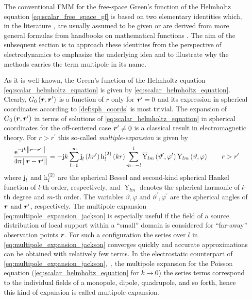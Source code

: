 The conventional \ac{FMM} for the free-space Green's function
of the Helmholtz equation \eqref{eq:scalar_free_space_gf} is based on two
elementary identities which, in the literature \cite{Rokhlin1993,Coifman1993},
are usually assumed to be given or are derived from more general formulas from
handbooks on mathematical functions \cite{Abramowitz2014,Abramowitz2014}.
The aim of the subsequent section is to approach these identities from
the perspective of electrodynamics to emphasize the underlying idea and to
illustrate why the methods carries the term multipole in its name.

As it is well-known, the Green's function of the Helmholtz equation
\eqref{eq:scalar_helmholtz_equation} is given by
\eqref{eq:scalar_helmholtz_equation}.
Clearly, $G_0\left(\robs, \rsrc\right)$ is a function of $r$ only for
$\rsrc = 0$ and its expression in spherical coordinates according to
\cref{def:sph_coords} is most trivial.
The expansion of $G_0\left(\robs, \rsrc\right)$ in terms of solutions of
\eqref{eq:scalar_helmholtz_equation} in spherical coordinates for the
off-centered case $\rsrc \neq 0$ is a classical result in electromagnetic
theory.
For $r > r^\prime$ this so-called \emph{multiple-expansion} is given by
\cite[492]{Jackson2013}
\begin{equation}\label{eq:multipole_expansion_jackson}
	\frac{\exp{-\im k \rdiffNorm}}{4\pi \rdiffNorm} = 
	-\im k \sum_{l = 0}^{\infty}
	\sphbesselj{l} \left(k r^\prime\right)
	\sphbesselh{2}{l} \left(k r\right)
	\sum_{m = -l}^{l}
	\complexConjugate{\operatorname{Y}}_{l m}
	\left( \vartheta^\prime, \varphi^\prime \right) 
	\operatorname{Y}_{l m}
	\left( \vartheta, \varphi\right)
	\qquad
	r > r^\prime
\end{equation}
where $\sphbesselj{l}$ and $\sphbesselh{2}{l}$ are the spherical Bessel and
second-kind spherical Hankel function of $l$-th order, respectively, and
$\operatorname{Y}_{l m}$ denotes the spherical harmonic of $l$-th degree and
$m$-th order.
The variables $\vartheta, \varphi$ and $\vartheta^\prime, \varphi^\prime$ are
the spherical angles of $\robs$ and $\rsrc$, respectively.
The multipole expansion \eqref{eq:multipole_expansion_jackson} is especially
useful if the field of a source distribution of local support within a
\enquote{small} domain is considered for \enquote{far-away} observation points
$\robs$.
For such a configuration the series over $l$ in
\eqref{eq:multipole_expansion_jackson} converges quickly and accurate
approximations can be obtained with relatively few terms.
In the electrostatic counterpart of \eqref{eq:multipole_expansion_jackson},~\ie,
the multipole expansion for the Poisson equation
(\eqref{eq:scalar_helmholtz_equation} for $k \to 0$) the series terms correspond
to the individual fields of a monopole, dipole, quadrupole,
and so forth, hence this kind of expansion is called multipole expansion.

